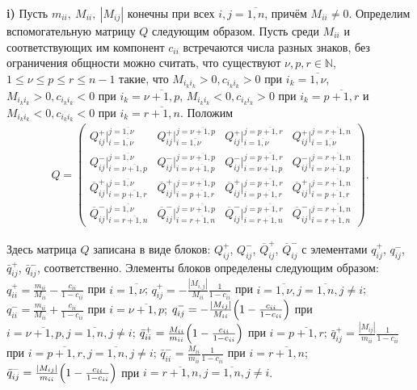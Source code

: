 \textbf{i)} Пусть $m_{ii},\: M_{ii},\:|M_{ij}|$ конечны при всех $i,j=\overline{1,n}$, причём ${M_{ii}\neq 0}$.
Определим вспомогательную матрицу $Q$ следующим образом. Пусть среди $M_{ii}$ и соответствующих им компонент $c_{ii}$ встречаются числа разных знаков, без ограничения общности можно считать, что существуют $\nu, p, r\in \mathbb{N}$,  $1\leqslant \nu\leqslant p\leqslant r\leqslant n-1$ такие, что $M_{i_ki_k}>0, c_{i_ki_k}>0$ при $i_k=\overline{1,\nu}$, $M_{i_ki_k}>0, c_{i_ki_k}<0$ при $i_k=\overline{\nu+1,p}$, $M_{i_ki_k}<0, c_{i_ki_k}>0$ при $i_k=\overline{p+1,r}$  и $M_{i_ki_k}<0, c_{i_ki_k}<0$ при $i_k=\overline{r+1,n}$.
Положим
\begin{multline*}
Q=
\begin{pmatrix}
Q^+_{ij}\bigr|_{i=\overline{1,\nu}}^{j=\overline{1,\nu}}& Q^+_{ij}\bigr|_{i=\overline{1,\nu}}^{j=\overline{\nu+1,p}}&
Q^+_{ij}\bigr|_{i=\overline{1,\nu}}^{j=\overline{p+1,r}}& Q^+_{ij}\bigr|_{i=\overline{1,\nu}}^{j=\overline{r+1,n}}\\
Q^-_{ij}\bigr|_{i=\overline{\nu+1,p}}^{j=\overline{1,\nu}}&
Q^-_{ij}\bigr|_{i=\overline{\nu+1,p}}^{j=\overline{\nu+1,p}}&
Q^-_{ij}\bigr|_{i=\overline{\nu+1,p}}^{j=\overline{p+1,r}}&
Q^-_{ij}\bigr|_{i=\overline{\nu+1,p}}^{j=\overline{r+1,n}}\\
\overline{Q}^+_{ij}\bigr|_{i=\overline{p+1,r}}^{j=\overline{1,\nu}}&
\overline{Q}^+_{ij}\bigr|_{i=\overline{p+1,r}}^{j=\overline{\nu+1,p}}&
\overline{Q}^+_{ij}\bigr|_{i=\overline{p+1,r}}^{j=\overline{p+1,r}}&
\overline{Q}^+_{ij}\bigr|_{i=\overline{p+1,r}}^{j=\overline{r+1,n}}\\
\overline{Q}^-_{ij}\bigr|_{i=\overline{r+1,n}}^{j=\overline{1,\nu}}&
\overline{Q}^-_{ij}\bigr|_{i=\overline{r+1,n}}^{j=\overline{\nu+1,p}}&
\overline{Q}^-_{ij}\bigr|_{i=\overline{r+1,n}}^{j=\overline{p+1,r}}&
\overline{Q}^-_{ij}\bigr|_{i=\overline{r+1,n}}^{j=\overline{r+1,n}}
\end{pmatrix}.
\end{multline*}


Здесь матрица $Q$ записана в виде блоков:  $Q^+_{ij}$, $Q^-_{ij}$, $\overline{Q}^+_{ij}$, $\overline{Q}^-_{ij}$ с элементами $q^+_{ij}$, $q^-_{ij}$, $\bar{q}^+_{ij}$, $\bar{q}^-_{ij}$, соответственно. Элементы блоков определены следующим образом: $q^+_{ii}=\frac{m_{ii}}{M_{ii}}-\frac{c_{ii}}{1-c_{ii}}$ при $i=\overline{1, \nu}$; $q^+_{ij}=-\frac{|M_{i,j}|}{M_{ii}} \frac{1}{1-c_{ii}}$ при $i=\overline{1, \nu}, j=\overline{1, n}, j\neq i$; $q^-_{ii}=\frac{m_{ii}}{M_{ii}}+\frac{c_{ii}}{1-c_{ii}}$ при $i=\overline{\nu+1, p}$; $q^-_{ij}=-\frac{|M_{ij}|}{M_{ii}} \Bigl(1-\frac{c_{ii}}{1-c_{ii}}\Bigr)$ при $i=\overline{\nu+1, p}, j=\overline{1,n}, j\neq i$; $\bar{q}^+_{ii}=\frac{M_{ii}}{m_{ii}}\Bigl(1-\frac{c_{ii}}{1-c_{ii}}\Bigr)$  при $i=\overline{p+1, r}$; $\bar{q}^+_{ij}=\frac{|M_{ij}|}{m_{ii}}\frac{1}{1-c_{ii}}$ при $i=\overline{p+1, r}, j=\overline{1,n}, j\neq i$; $\bar{q}^-_{ii}=\frac{M_{ii}}{m_{ii}}\frac{1}{1-c_{ii}}$ при $i=\overline{r+1, n}$; $\bar{q}^-_{ij}= \frac{|M_{ij}|}{m_{ii}}\Bigl(1-\frac{c_{ii}}{1-c_{ii}}\Bigr)$ при $i=\overline{r+1, n}, j=\overline{1,n},  j\neq i$.


